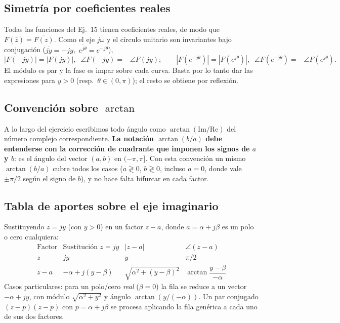\documentclass[10pt,a4paper]{article}
\begin{document}
\subsection*{Simetría por coeficientes reales}

Todas las funciones del Ej.~15 tienen coeficientes reales, de modo que $F(\bar z) = \overline{F(z)}$. Como el eje $j\omega$ y el círculo unitario son invariantes bajo conjugación ($\overline{jy}=-jy$,\, $\overline{e^{j\theta}}=e^{-j\theta}$),
\[
	|F(-jy)| = |F(jy)|,\;\; \angle F(-jy) = -\angle F(jy);\qquad
	|F(e^{-j\theta})| = |F(e^{j\theta})|,\;\; \angle F(e^{-j\theta}) = -\angle F(e^{j\theta}).
\]
El módulo es par y la fase es impar sobre cada curva. Basta por lo tanto dar las expresiones para $y>0$ (resp.\ $\theta\in(0,\pi)$); el resto se obtiene por reflexión.

\subsection*{Convención sobre $\arctan$}

A lo largo del ejercicio escribimos todo ángulo como $\arctan(\text{Im}/\text{Re})$ del número complejo correspondiente. \textbf{La notación $\arctan(b/a)$ debe entenderse con la corrección de cuadrante que imponen los signos de $a$ y $b$}: es el ángulo del vector $(a,b)$ en $(-\pi,\pi]$. Con esta convención un mismo $\arctan(b/a)$ cubre todos los casos ($a\gtrless 0$, $b\gtrless 0$, incluso $a=0$, donde vale $\pm\pi/2$ según el signo de $b$), y no hace falta bifurcar en cada factor.

\subsection*{Tabla de aportes sobre el eje imaginario}

Sustituyendo $z=jy$ (con $y>0$) en un factor $z-a$, donde $a=\alpha+j\beta$ es un polo o cero cualquiera:
\[
	\renewcommand{\arraystretch}{1.5}
	\begin{array}{l|c|c|c}
	\text{Factor} & \text{Sustitución }z=jy & |z-a| & \angle(z-a) \\\hline
	z            & jy                      & y                              & \pi/2 \\
	z-a          & -\alpha + j(y-\beta)    & \sqrt{\alpha^2+(y-\beta)^2}   & \arctan\!\dfrac{y-\beta}{-\alpha}
	\end{array}
\]
Casos particulares: para un polo/cero \emph{real} ($\beta=0$) la fila se reduce a un vector $-\alpha+jy$, con módulo $\sqrt{\alpha^2+y^2}$ y ángulo $\arctan(y/(-\alpha))$. Un par conjugado $(z-p)(z-\bar p)$ con $p=\alpha+j\beta$ se procesa aplicando la fila genérica a cada uno de sus dos factores.
\end{document}
